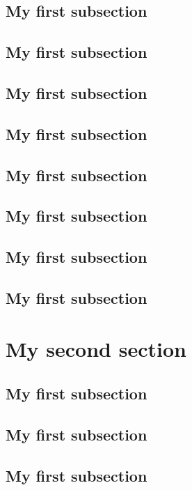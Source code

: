 \documentclass[fontsize=10pt,open=any,twocolumn]{scrbook}%
\begin{document}
            \subsection{My first subsection}
                \blindtext
            \subsection{My first subsection}
                \blindtext
            \subsection{My first subsection}
                \blindtext
            \subsection{My first subsection}
                \blindtext
            \subsection{My first subsection}
                \blindtext
            \subsection{My first subsection}
                \blindtext
            \subsection{My first subsection}
                \blindtext
            \subsection{My first subsection}
                \blindtext
        \section{My second section}
                \blindtext
            \subsection{My first subsection}
                \blindtext
            \subsection{My first subsection}
                \blindtext     
            \subsection{My first subsection}
                \blindtext
\end{document}
